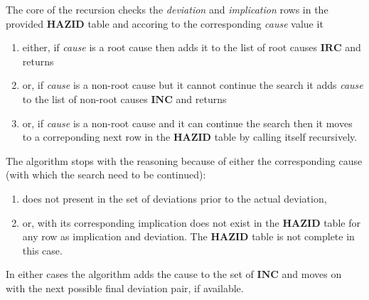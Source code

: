 \documentclass[conference]{IEEEtran}
\begin{document}
The core of the recursion checks the \textit{deviation} and \textit{implication} rows in the provided $\mathbf{HAZID}$ table and accoring to the corresponding \textit{cause} value it
\begin{enumerate}
\item either, if \textit{cause} is a root cause then adds it to the list of root causes $\mathbf{IRC}$ and returns
\item or, if \textit{cause} is a non-root cause but it cannot continue the search it adds \textit{cause} to the list of non-root causes $\mathbf{INC}$ and returns
\item or, if \textit{cause} is a non-root cause and it can continue the search then it moves to a correponding next row in the $\mathbf{HAZID}$ table by calling itself recursively.
\end{enumerate}

The algorithm stops with the reasoning because of either the corresponding cause (with which the search need to be continued):
\begin{enumerate}
\item does not present in the set of deviations prior to the actual deviation,
\item or, with its corresponding implication does not exist in the $\mathbf{HAZID}$ table for any row as implication and deviation. The $\mathbf{HAZID}$ table is not complete in this case.
\end{enumerate}

In either cases the algorithm adds the cause to the set of $\mathbf{INC}$ and moves on with the next possible final deviation pair, if available.
\end{document}
